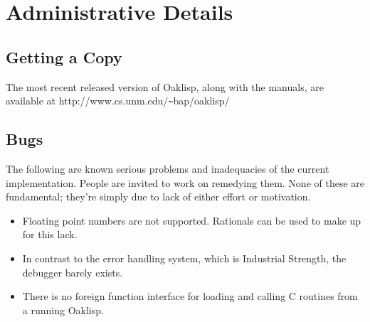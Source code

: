 \chapter{Administrative Details}

\section{Getting a Copy}

The most recent released version of Oaklisp, along with the manuals,
are available at http://www\linebreak[0].\linebreak[0]cs\linebreak[0].\linebreak[0]unm\linebreak[0].\linebreak[0]edu\linebreak[0]/\linebreak[0]\texttt{\~}bap\linebreak[0]/\linebreak[0]oaklisp/

\section{Bugs}

The following are known serious problems and inadequacies of the
current implementation.  People are invited to work on remedying them.
None of these are fundamental; they're simply due to lack of either
effort or motivation.

\begin{itemize}
\item Floating point numbers are not supported.  Rationals can be
used to make up for this lack.

\item In contrast to the error handling system, which is Industrial
Strength, the debugger barely exists.

\item There is no foreign function interface for loading and calling
C routines from a running Oaklisp.

%
\end{itemize}

